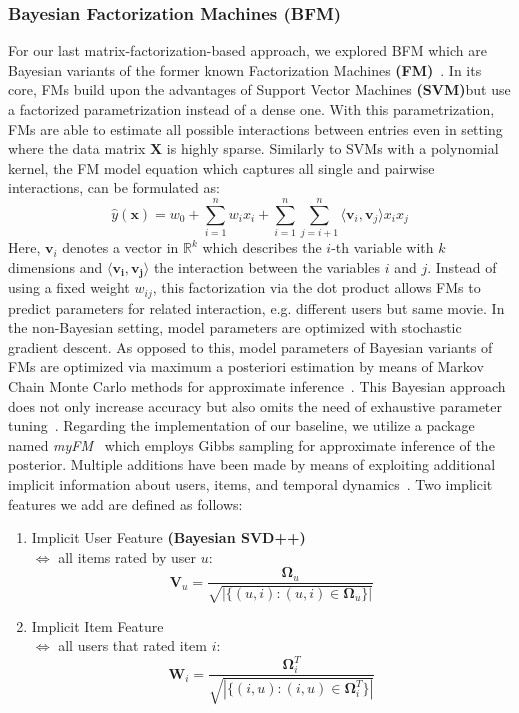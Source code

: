 \documentclass[10pt,conference,compsocconf]{IEEEtran}
\begin{document}
    \subsubsection{Bayesian Factorization Machines \textbf{(BFM)}}
    For our last matrix-factorization-based approach, we explored BFM which are Bayesian variants of the former known Factorization Machines \textbf{(FM)}~\cite{rendle_factorization_2010}.
    In its core, FMs build upon the advantages of Support Vector Machines \textbf{(SVM)}but use a factorized parametrization instead of a dense one.
    With this parametrization, FMs are able to estimate all possible interactions between entries even in setting where the data matrix $\mathbf{X}$ is highly sparse.
    Similarly to SVMs with a polynomial kernel, the FM model equation which captures all single and pairwise interactions, can be formulated as:
    $$\hat{y}(\mathbf{x})=w_0+\sum^n_{i=1}w_ix_i + \sum^n_{i=1}\sum^n_{j=i+1}\langle \mathbf{v}_i,\mathbf{v}_j \rangle x_ix_j$$
    Here, $\mathbf{v}_i$ denotes a vector in $\mathbb{R}^k$ which describes the $i$-th variable with $k$ dimensions and $\langle \mathbf{v_i},\mathbf{v_j} \rangle$ the interaction between the variables $i$ and $j$.
    Instead of using a fixed weight $w_{ij}$, this factorization via the dot product allows FMs to predict parameters for related interaction, e.g. different users but same movie.
    In the non-Bayesian setting, model parameters are optimized with stochastic gradient descent.
    As opposed to this, model parameters of Bayesian variants of FMs are optimized via maximum a posteriori estimation by means of Markov Chain Monte Carlo methods for approximate inference~\cite{salakhutdinov_bayesian_2008}.
    This Bayesian approach does not only increase accuracy but also omits the need of exhaustive parameter tuning~\cite{freudenthaler_bayesian_2011}.
    Regarding the implementation of our baseline, we utilize a package named \textit{myFM}~\cite{noauthor_myfm_nodate} which employs Gibbs sampling for approximate inference of the posterior.
    Multiple additions have been made by means of exploiting additional implicit information about users, items, and temporal dynamics~\cite{rendle_scaling_2013,koren_factorization_2008,koren_collaborative_2009}.
    Two implicit features we add are defined as follows:
    \begin{enumerate}
        \item Implicit User Feature \textbf{(Bayesian SVD++)} \\ $\Leftrightarrow$ all items rated by user $u$:
        $$\mathbf{V}_u=\frac{\mathbf{\Omega}_u}{\sqrt{|\{(u,i): (u,i) \in \mathbf{\Omega}_u\}|}}$$
        \item Implicit Item Feature \\ $\Leftrightarrow$ all users that rated item $i$:
        $$\mathbf{W}_i=\frac{\mathbf{\Omega}^T_i}{\sqrt{|\{(i,u): (i,u) \in \mathbf{\Omega}^T_i\}|}}$$
    \end{enumerate}
\end{document}

